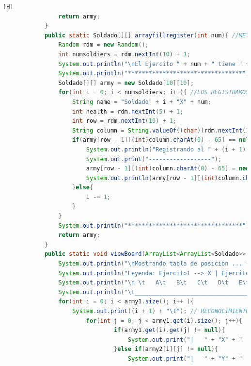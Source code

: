 \documentclass{article}
\begin{document}
\begin{lstlisting}[language=java,caption={Las lineas de codigos del metodo creado:}][H]
				return army;
			}
			public static Soldado[][] arrayfillregister(int num){ //METODO CREADO PARA PODER CREAR AL EJERCITO 2 EL CUAL USAREMOS LA ESTRUCTURA DE DATO QUE ES EL ARRAY CON TAL QUE TAMBIEN REGISTRAMOS 
				Random rdm = new Random();
				int numsoldiers = rdm.nextInt(10) + 1;
				System.out.println("\nEl Ejercito " + num + " tiene " + numsoldiers + " soldados:");  
				System.out.println("*********************************");
				Soldado[][] army = new Soldado[10][10];
				for(int i = 0; i < numsoldiers; i++){ //LOS REGISTRAMOS A CADA UNO POR EL ORDEN DE CREACION QUE FUERON CREADOS EL CUAL TAMBIEN COMPLETAMOS SUS DATOS Y LOS PUBLICAMOS POR ORDEN          
					String name = "Soldado" + i + "X" + num;            
					int health = rdm.nextInt(5) + 1;
					int row = rdm.nextInt(10) + 1;
					String column = String.valueOf((char)(rdm.nextInt(10) + 65));  
					if(army[row - 1][(int)column.charAt(0) - 65] == null){ //VERIFICAMOS QUE NO SE REPITAN MISMOS SOLDADOS DE UN EJERCITO EN EL MISMO CUADRADO 
						System.out.println("Registrando al " + (i + 1) + " soldado del Ejercito " + num + "");   
						System.out.print("------------------");
						army[row - 1][(int)column.charAt(0) - 65] = new Soldado(name, health, row, column);
						System.out.println(army[row - 1][(int)column.charAt(0) - 65].toString());
					}else{
						i -= 1;
					}
				}
				System.out.println("*********************************");
				return army;
			}
			public static void viewBoard(ArrayList<ArrayList<Soldado>> army1, Soldado[][] army2){//EN ESTE METODO NOS AYUDAMOS DEL ANTERIOR ARCHIVO YA QUE TENDRIAMOS UNA BASE PARA PODER CREARLO
				System.out.println("\nMostrando tabla de posicion ... --");
				System.out.println("Leyenda: Ejercito1 --> X | Ejercito2 --> Y"); //RECONOCIMIENTO PARA LOS EJERCITOS Y POSICION DE SUS SOLDADOS
				System.out.println("\n \t   A\t   B\t   C\t   D\t   E\t   F\t   G\t   H\t   I\t   J"); // RECONOCIMIENTO PARA CADA UBICACION DE CADA SOLDADO EN EL TABLERO POR PARTE DE LAS COLUMNAS
				System.out.println("\t_________________________________________________________________________________");
				for(int i = 0; i < army1.size(); i++ ){
					System.out.print((i + 1) + "\t"); // RECONOCIMIENTO PARA CADA UBICACION DE CADA SOLDADO EN EL TABLERO POR PARTE DE LAS FILAS
						for(int j = 0; j < army1.get(i).size(); j++){
								if(army1.get(i).get(j) != null){
									System.out.print("|   " + "X" + "   "); //VERIFICANDOLA POSICIONES DE CADA SOLDADO DE CADA EJERCITO CON SU RESPECTIVO INDICADOR PARA PODER UBICARLOS
								}else if(army2[i][j] != null){
									System.out.print("|   " + "Y" + "   ");

\end{lstlisting}
\end{document}
